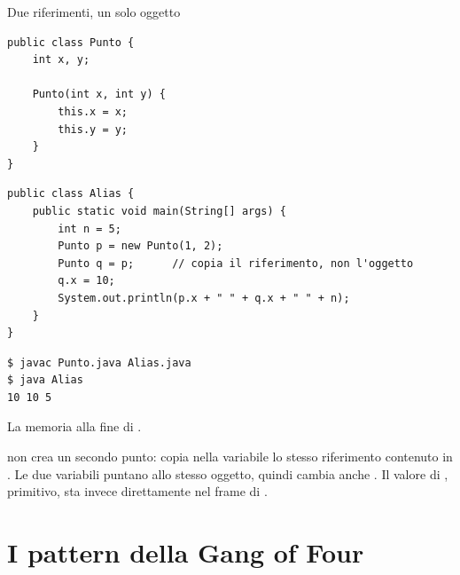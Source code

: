 \begin{esempio}{Due riferimenti, un solo oggetto}
\noindent\begin{minipage}[c]{0.6\textwidth}
\begin{lstlisting}[style=java, name=Punto.java]
public class Punto {
    int x, y;

    Punto(int x, int y) {
        this.x = x;
        this.y = y;
    }
}
\end{lstlisting}
\begin{lstlisting}[style=java, name=Alias.java]
public class Alias {
    public static void main(String[] args) {
        int n = 5;
        Punto p = new Punto(1, 2);
        Punto q = p;      // copia il riferimento, non l'oggetto
        q.x = 10;
        System.out.println(p.x + " " + q.x + " " + n);
    }
}
\end{lstlisting}
\begin{lstlisting}[style=shell, name=Terminale]
$ javac Punto.java Alias.java
$ java Alias
10 10 5
\end{lstlisting}
\end{minipage}\hfill
\begin{minipage}[c]{0.37\textwidth}
\centering
{}

\vspace{4pt}
{\scriptsize La memoria alla fine di .\par}
\end{minipage}

\medskip
{} non crea un secondo punto: copia nella variabile  lo stesso riferimento contenuto in . Le
due variabili puntano allo stesso oggetto, quindi  cambia anche . Il valore di , primitivo,
sta invece direttamente nel frame di .
\end{esempio}

\section{I pattern della Gang of Four}

